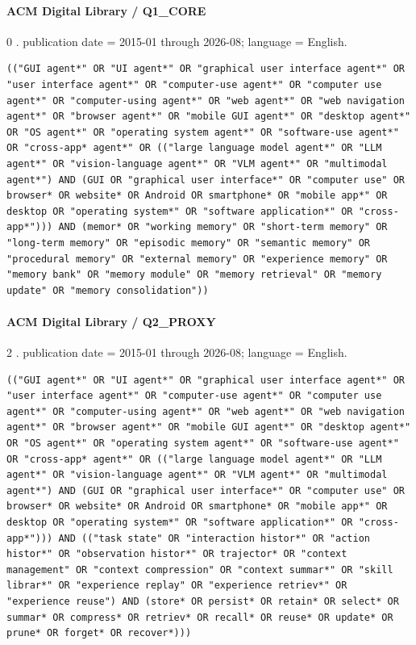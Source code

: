 \noindent\begin{minipage}{\linewidth}
\paragraph{ACM Digital Library / Q1\_CORE}
0 .
publication date = 2015-01 through 2026-08; language = English.
\begin{lstlisting}
(("GUI agent*" OR "UI agent*" OR "graphical user interface agent*" OR "user interface agent*" OR "computer-use agent*" OR "computer use agent*" OR "computer-using agent*" OR "web agent*" OR "web navigation agent*" OR "browser agent*" OR "mobile GUI agent*" OR "desktop agent*" OR "OS agent*" OR "operating system agent*" OR "software-use agent*" OR "cross-app* agent*" OR (("large language model agent*" OR "LLM agent*" OR "vision-language agent*" OR "VLM agent*" OR "multimodal agent*") AND (GUI OR "graphical user interface*" OR "computer use" OR browser* OR website* OR Android OR smartphone* OR "mobile app*" OR desktop OR "operating system*" OR "software application*" OR "cross-app*"))) AND (memor* OR "working memory" OR "short-term memory" OR "long-term memory" OR "episodic memory" OR "semantic memory" OR "procedural memory" OR "external memory" OR "experience memory" OR "memory bank" OR "memory module" OR "memory retrieval" OR "memory update" OR "memory consolidation"))
\end{lstlisting}
\end{minipage}\par\medskip
\noindent\begin{minipage}{\linewidth}
\paragraph{ACM Digital Library / Q2\_PROXY}
2 .
publication date = 2015-01 through 2026-08; language = English.
\begin{lstlisting}
(("GUI agent*" OR "UI agent*" OR "graphical user interface agent*" OR "user interface agent*" OR "computer-use agent*" OR "computer use agent*" OR "computer-using agent*" OR "web agent*" OR "web navigation agent*" OR "browser agent*" OR "mobile GUI agent*" OR "desktop agent*" OR "OS agent*" OR "operating system agent*" OR "software-use agent*" OR "cross-app* agent*" OR (("large language model agent*" OR "LLM agent*" OR "vision-language agent*" OR "VLM agent*" OR "multimodal agent*") AND (GUI OR "graphical user interface*" OR "computer use" OR browser* OR website* OR Android OR smartphone* OR "mobile app*" OR desktop OR "operating system*" OR "software application*" OR "cross-app*"))) AND (("task state" OR "interaction histor*" OR "action histor*" OR "observation histor*" OR trajector* OR "context management" OR "context compression" OR "context summar*" OR "skill librar*" OR "experience replay" OR "experience retriev*" OR "experience reuse") AND (store* OR persist* OR retain* OR select* OR summar* OR compress* OR retriev* OR recall* OR reuse* OR update* OR prune* OR forget* OR recover*)))
\end{lstlisting}
\end{minipage}\par\medskip
